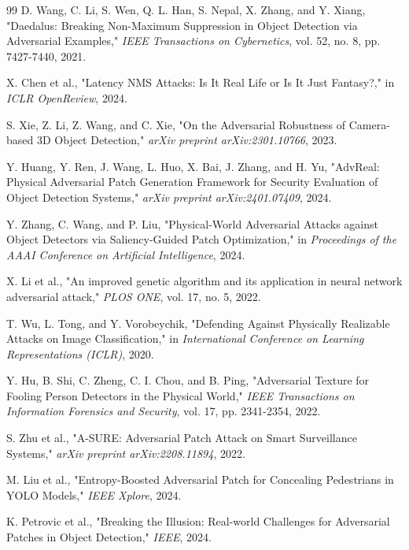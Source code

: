 \documentclass[a4paper,fleqn]{cas-dc}
\begin{document}
\begin{thebibliography}{99}
 D. Wang, C. Li, S. Wen, Q. L. Han, S. Nepal, X. Zhang, and Y.
Xiang, "Daedalus: Breaking Non-Maximum Suppression in Object Detection
via Adversarial Examples," \emph{IEEE Transactions on Cybernetics}, vol.
52, no. 8, pp. 7427-7440, 2021.

 X. Chen et al., "Latency NMS Attacks: Is It Real Life or Is It
Just Fantasy?," in \emph{ICLR OpenReview}, 2024.

 S. Xie, Z. Li, Z. Wang, and C. Xie, "On the Adversarial
Robustness of Camera-based 3D Object Detection," \emph{arXiv preprint
arXiv:2301.10766}, 2023.

 Y. Huang, Y. Ren, J. Wang, L. Huo, X. Bai, J. Zhang, and H. Yu,
"AdvReal: Physical Adversarial Patch Generation Framework for Security
Evaluation of Object Detection Systems," \emph{arXiv preprint
arXiv:2401.07409}, 2024.

 Y. Zhang, C. Wang, and P. Liu, "Physical-World Adversarial
Attacks against Object Detectors via Saliency-Guided Patch
Optimization," in \emph{Proceedings of the AAAI Conference on Artificial
Intelligence}, 2024.

 X. Li et al., "An improved genetic algorithm and its
application in neural network adversarial attack," \emph{PLOS ONE}, vol.
17, no. 5, 2022.

 T. Wu, L. Tong, and Y. Vorobeychik, "Defending Against
Physically Realizable Attacks on Image Classification," in
\emph{International Conference on Learning Representations (ICLR)},
2020.

 Y. Hu, B. Shi, C. Zheng, C. I. Chou, and B. Ping, "Adversarial
Texture for Fooling Person Detectors in the Physical World," \emph{IEEE
Transactions on Information Forensics and Security}, vol. 17, pp.
2341-2354, 2022.

 S. Zhu et al., "A-SURE: Adversarial Patch Attack on Smart
Surveillance Systems," \emph{arXiv preprint arXiv:2208.11894}, 2022.

 M. Liu et al., "Entropy-Boosted Adversarial Patch for
Concealing Pedestrians in YOLO Models," \emph{IEEE Xplore}, 2024.

 K. Petrovic et al., "Breaking the Illusion: Real-world
Challenges for Adversarial Patches in Object Detection," \emph{IEEE},
2024.

\end{thebibliography}

\end{document}
